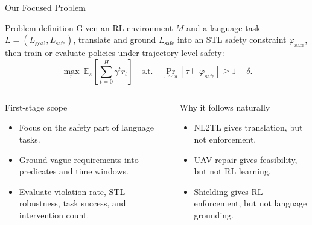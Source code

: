 \documentclass[aspectratio=169]{beamer}
\begin{document}
\begin{frame}{Our Focused Problem}
\begin{block}{Problem definition}
\footnotesize
Given an RL environment \(M\) and a language task \(L=(L_{\mathrm{goal}},L_{\mathrm{safe}})\), translate and ground \(L_{\mathrm{safe}}\) into an STL safety constraint \(\varphi_{\mathrm{safe}}\), then train or evaluate policies under trajectory-level safety:
{\scriptsize
\[
\max_{\pi}\ \mathbb{E}_{\pi}\!\left[\sum_{t=0}^{H}\gamma^t r_t\right]
\quad
\text{s.t.}\quad
\Pr_{\tau\sim\pi}\!\left[\tau \models \varphi_{\mathrm{safe}}\right]\ge 1-\delta .
\]
}
\end{block}

\begin{columns}[T]
\begin{block}{First-stage scope}
\footnotesize
\begin{itemize}
  \item Focus on the safety part of language tasks.
  \item Ground vague requirements into predicates and time windows.
  \item Evaluate violation rate, STL robustness, task success, and intervention count.
\end{itemize}
\end{block}

\begin{block}{Why it follows naturally}
\footnotesize
\begin{itemize}
  \item NL2TL gives translation, but not enforcement.
  \item UAV repair gives feasibility, but not RL learning.
  \item Shielding gives RL enforcement, but not language grounding.
\end{itemize}
\end{block}
\end{columns}
\end{frame}
\end{document}
